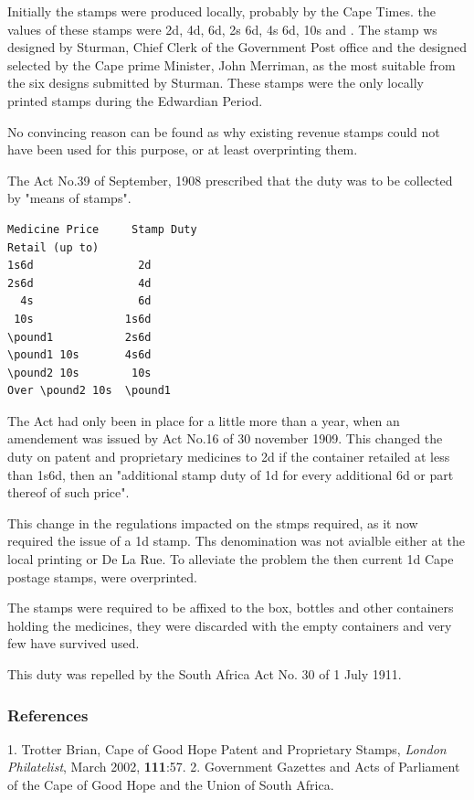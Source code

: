 Initially the stamps were produced locally, probably by the Cape Times. the values of these stamps were 2d, 4d, 6d, 2s 6d, 4s 6d, 10s and . The stamp ws designed by Sturman, Chief Clerk of the Government Post office and the designed selected by the Cape prime Minister, John Merriman, as the most suitable from the six designs submitted by Sturman. These stamps were the only locally printed stamps during the Edwardian Period.

No convincing reason can be found as why existing revenue stamps could not have been used for this purpose, or at least overprinting them.




The Act No.39 of September, 1908 prescribed that the duty was to be collected by
"means of stamps".

\begin{verbatim}
Medicine Price     Stamp Duty
Retail (up to)
1s6d				2d
2s6d				4d
  4s				6d
 10s 			  1s6d	
\pound1           2s6d 
\pound1 10s       4s6d
\pound2 10s        10s
Over \pound2 10s  \pound1
\end{verbatim}

The Act had only been in place for a little more than a year, when an amendement was issued
by Act No.16 of 30 november 1909. This changed the duty on patent and proprietary medicines to 2d if the container retailed at less than 1s6d, then an "additional stamp duty of 1d for every additional 6d or part thereof of such price".

This change in the regulations impacted on the stmps required, as it now required the
issue of a 1d stamp. Ths denomination was not avialble either at the local printing or De La Rue. To alleviate the problem the then current 1d Cape postage stamps, were overprinted.

The stamps were required to be affixed to the box, bottles and other containers holding the medicines, they were discarded with the empty containers and very few
have survived used.

This duty was repelled by the South Africa Act No. 30 of 1 July 1911.



\subsubsection{References}

1. Trotter Brian, Cape of Good Hope Patent and Proprietary Stamps, \textit{London Philatelist}, March 2002, \textbf{111}:57. 
2. Government Gazettes and Acts of Parliament of the Cape of Good Hope and the Union of South Africa.            